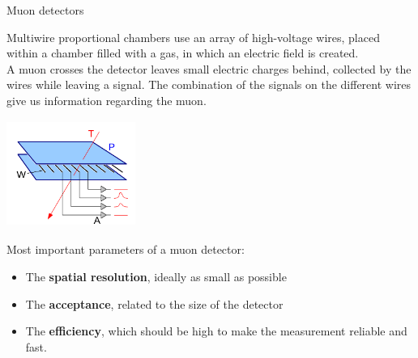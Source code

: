 \documentclass[handout,8 pt]{beamer}
\begin{document}
\begin{frame}{Muon detectors}
\justifying
\begin{minipage}[c]{.58\textwidth}
\justifying
Multiwire proportional chambers use an array of high-voltage wires, placed within a chamber filled with a gas, in which an electric field is created. \\ \vspace{10pt}
A muon crosses the detector leaves small electric charges behind, collected by the wires while leaving a signal. The combination of the signals on the different wires give us information regarding the muon.
\end{minipage} \hfill
\begin{minipage}[c]{.39\textwidth}
\includegraphics[width=4.2cm, height=3.5cm]{figs/wireChambers.png}
\end{minipage} \hfill \vfill

Most important parameters of a muon detector:
\begin{itemize}
\justifying
\item The \textbf{spatial resolution}, ideally as small as possible
\item The \textbf{acceptance}, related to the size of the detector
\item The \textbf{efficiency}, which should be high to make the measurement reliable and fast.
\end{itemize}
\end{frame}
\end{document}
